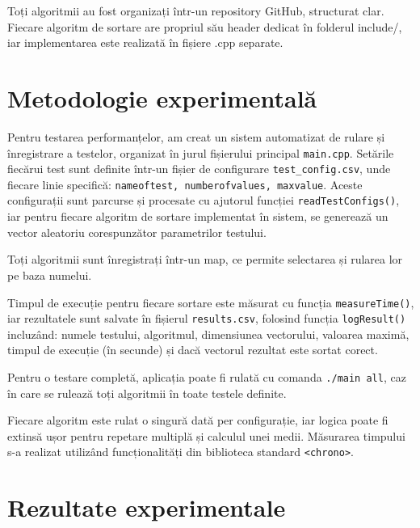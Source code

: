 \documentclass[12pt]{article}
\begin{document}
\begin{justify}
Toți algoritmii au fost organizați într-un repository GitHub, structurat clar.
Fiecare algoritm de sortare are propriul său header dedicat în folderul include/, iar
implementarea este realizată în fișiere .cpp separate.
\end{justify}


\section{Metodologie experimentală}

Pentru testarea performanțelor, am creat un sistem automatizat de rulare și înregistrare a testelor, organizat în jurul fișierului principal \texttt{main.cpp}. Setările fiecărui test sunt definite într-un fișier de configurare \texttt{test\_config.csv}, unde fiecare linie specifică: \texttt{nameoftest, numberofvalues, maxvalue}. Aceste configurații sunt parcurse și procesate cu ajutorul funcției \texttt{readTestConfigs()}, iar pentru fiecare algoritm de sortare implementat în sistem, se generează un vector aleatoriu corespunzător parametrilor testului.

Toți algoritmii sunt înregistrați într-un map, ce permite selectarea și rularea lor pe baza numelui.

Timpul de execuție pentru fiecare sortare este măsurat cu funcția \texttt{measureTime()}, iar rezultatele sunt salvate în fișierul \texttt{results.csv}, folosind funcția \texttt{logResult()} incluzând: numele testului, algoritmul, dimensiunea vectorului, valoarea maximă, timpul de execuție (în secunde) și dacă vectorul rezultat este sortat corect.

Pentru o testare completă, aplicația poate fi rulată cu comanda \texttt{./main all}, caz în care se rulează toți algoritmii în toate testele definite.

\bigskip

Fiecare algoritm este rulat o singură dată per configurație, iar logica poate fi extinsă ușor pentru repetare multiplă și calculul unei medii. Măsurarea timpului s-a realizat utilizând funcționalități din biblioteca standard \texttt{<chrono>}.

\section{Rezultate experimentale}
\end{document}
